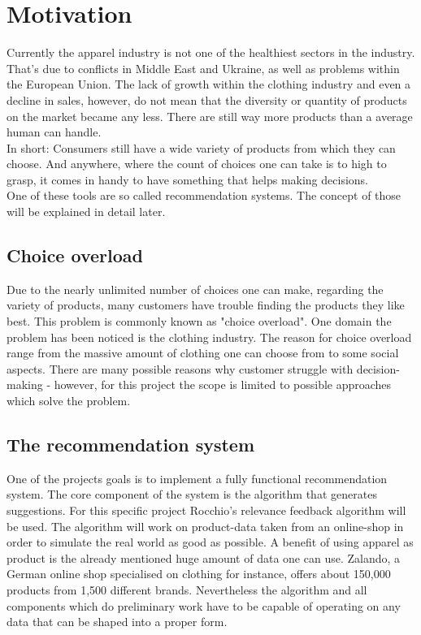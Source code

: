 

\section{Motivation}
Currently the apparel industry is not one of the healthiest sectors in the industry.
That's due to conflicts in Middle East and Ukraine, as well as problems within the European Union.\citep[p. 4]{alten:14}
The lack of growth within the clothing industry and even a decline in sales, however, do not mean that the diversity or quantity of products on the market became any less.
There are still way more products than a average human can handle.\\
In short: Consumers still have a wide variety of products from which they can choose.
And anywhere, where the count of choices one can take is to high to grasp, it comes in handy to have something that helps making decisions.\\
One of these tools are so called recommendation systems. The concept of those will be explained in detail later.


\subsection{Choice overload}
Due to the nearly unlimited number of choices one can make, regarding the variety of products, many customers have trouble finding the products they like best.
This problem is commonly known as "choice overload".\citep[p. 454]{stanton:12}
One domain the problem has been noticed is the clothing industry.
The reason for choice overload range from the massive amount of clothing one can choose from to some social aspects.
There are many possible reasons why customer struggle with decision-making\citep[p. 454]{stanton:12} - however, for this project the scope is limited to possible approaches which solve the problem.


\subsection{The recommendation system}
One of the projects goals is to implement a fully functional recommendation system.
The core component of the system is the algorithm that generates suggestions.
For this specific project Rocchio's relevance feedback algorithm will be used.
The algorithm will work on product-data taken from an online-shop in order to simulate the real world as good as possible.
A benefit of using apparel as product is the already mentioned huge amount of data one can use.
Zalando, a German online shop specialised on clothing for instance, offers about 150,000 products from 1,500 different brands.\citep{visser:14}
Nevertheless the algorithm and all components which do preliminary work have to be capable of operating on any data that can be shaped into a proper form.




